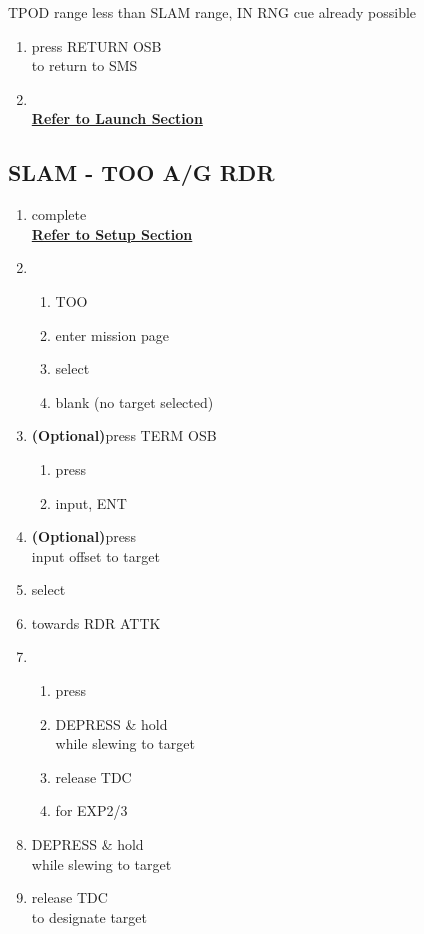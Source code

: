 \documentclass[fontInter, widesubsec]{TechCheck}
\begin{document}
	 TPOD range less than SLAM range, IN RNG cue already possible
	\begin{enumerate}[resume]
		\item {}\dotfill press RETURN OSB \\
		\hfill to return to SMS
		\item {} \\
		\hfill \hyperref[subsec:84launch]{\textbf{Refer to Launch Section}}
	\end{enumerate}

	\subsection{SLAM - TOO A/G RDR}
	\begin{enumerate}
		\item {}\dotfill complete \\
		\hfill \hyperref[subsec:84setup]{\textbf{Refer to Setup Section}}
		\item {}
		\begin{enumerate}
			\item {}\dotfill TOO
			\item {}\dotfill enter mission page
			\item {}\dotfill select
			\item {}\dotfill blank (no target selected)
		\end{enumerate}
		\item {} \textbf{(Optional)}\dotfill press TERM OSB
		\begin{enumerate}
			\item {}\dotfill press
			\item {}\dotfill input, ENT
		\end{enumerate}
		\item {} \textbf{(Optional)}\dotfill press \\
		\hfill input offset to target
		\item {}\dotfill select
		\item {}\dotfill towards RDR ATTK
		\item {}
		\begin{enumerate}
			\item {}\dotfill press
			\item {}\dotfill DEPRESS \& hold \\
			\hfill while slewing to target
			\item {}\dotfill release TDC
			\item {}\dotfill for EXP2/3
		\end{enumerate}
		\item {}\dotfill DEPRESS \& hold \\
		\hfill while slewing to target
		\item {}\dotfill release TDC \\
		\hfill to designate target
	\end{enumerate}
\end{document}
